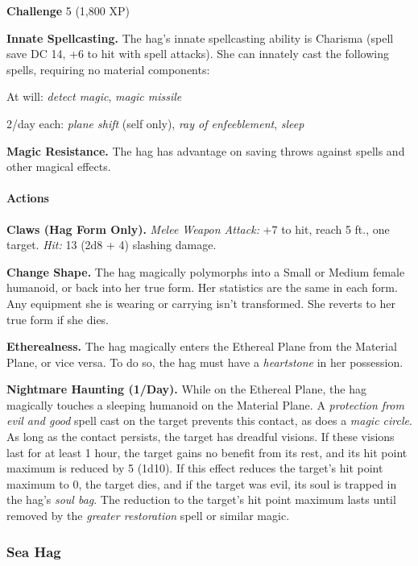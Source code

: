 \documentclass[
]{article}
\begin{document}
\textbf{Challenge} 5 (1,800 XP)

\textbf{Innate Spellcasting.} The hag's innate spellcasting ability is
Charisma (spell save DC 14, +6 to hit with spell attacks). She can
innately cast the following spells, requiring no material components:

At will: \emph{detect magic}, \emph{magic missile}

2/day each: \emph{plane shift} (self only), \emph{ray of enfeeblement},
\emph{sleep}

\textbf{Magic Resistance.} The hag has advantage on saving throws
against spells and other magical effects.

\hypertarget{actions-1}{%
\paragraph{Actions}\label{actions-1}}

\textbf{Claws (Hag Form Only).} \emph{Melee Weapon Attack:} +7 to hit,
reach 5 ft., one target. \emph{Hit:} 13 (2d8 + 4) slashing damage.

\textbf{Change Shape.} The hag magically polymorphs into a Small or
Medium female humanoid, or back into her true form. Her statistics are
the same in each form. Any equipment she is wearing or carrying isn't
transformed. She reverts to her true form if she dies.

\textbf{Etherealness.} The hag magically enters the Ethereal Plane from
the Material Plane, or vice versa. To do so, the hag must have a
\emph{heartstone} in her possession.

\textbf{Nightmare Haunting (1/Day).} While on the Ethereal Plane, the
hag magically touches a sleeping humanoid on the Material Plane. A
\emph{protection from evil and good} spell cast on the target prevents
this contact, as does a \emph{magic circle}. As long as the contact
persists, the target has dreadful visions. If these visions last for at
least 1 hour, the target gains no benefit from its rest, and its hit
point maximum is reduced by 5 (1d10). If this effect reduces the
target's hit point maximum to 0, the target dies, and if the target was
evil, its soul is trapped in the hag's \emph{soul bag}. The reduction to
the target's hit point maximum lasts until removed by the \emph{greater
restoration} spell or similar magic.

\hypertarget{sea-hag}{%
\subsubsection{Sea Hag}\label{sea-hag}}
\end{document}
